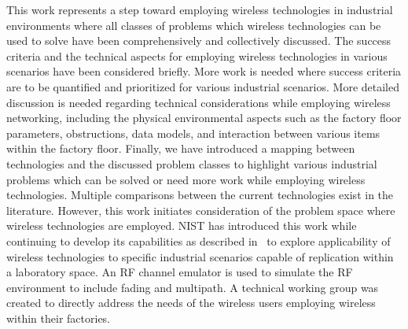     This work represents a step toward employing wireless technologies in industrial environments where all classes of problems which wireless technologies can be used to solve have been comprehensively and collectively discussed. The success criteria and the technical aspects for employing wireless technologies in various scenarios have been considered briefly. More work is needed where success criteria are to be quantified and prioritized for various industrial scenarios. More detailed discussion is needed regarding technical considerations while employing wireless networking, including the physical environmental aspects such as the factory floor parameters, obstructions, data models, and interaction between various items within the factory floor. Finally, we have introduced a mapping between technologies and the discussed problem classes to highlight various industrial problems which can be solved or need more work while employing wireless technologies. Multiple comparisons between the current technologies exist in the literature. However, this work initiates consideration of the problem space where wireless technologies are employed. NIST has introduced this work while continuing to develop its capabilities as described in~\cite{candell2015measuring} to explore applicability of wireless technologies to specific industrial scenarios capable of replication within a laboratory space. An RF channel emulator is used to simulate the RF environment to include fading and multipath. A technical working group was created to directly address the needs of the wireless users employing wireless within their factories.


%
%

